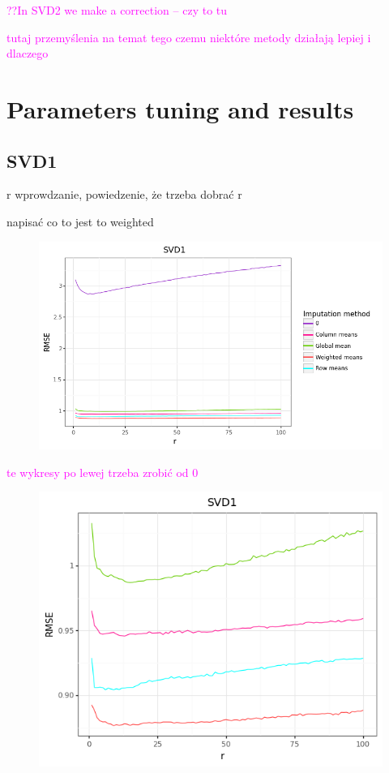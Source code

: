 \documentclass[11pt]{amsart}
\newcommand{\tami}[1]{{\textcolor{magenta}{#1}}}
\begin{document}
\tami{??In SVD2 we make a correction -- czy to tu}

\tami{tutaj przemyślenia na temat tego czemu niektóre metody działają lepiej i dlaczego}

\section*{Parameters tuning and results}

\subsection*{SVD1} r
wprowdzanie, powiedzenie, że trzeba dobrać r

napisać co to jest to weighted

\begin{figure}[H]
\includegraphics[scale=1]{fig/svd1_1}
\label{fig:figure}
\end{figure}
\tami{te wykresy po lewej trzeba zrobić od 0}

\begin{figure}[H]
\includegraphics[scale=0.45]{fig/svd1_2}
\label{fig:figure}
\end{figure}
\end{document}
